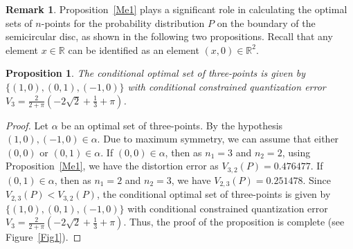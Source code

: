 \documentclass[12pt, reqno]{amsart}
\theoremstyle{plain}
\newtheorem{prop}[subsection]{Proposition}
\theoremstyle{definition}
\newtheorem{remark}[subsection]{Remark}
\newcommand{\set}[1]{\{#1\}}%
\newcommand{\ga}{\alpha}
\newcommand{\D}[1]{\mathbb{#1}}%
\begin{document}
\begin{remark}
Proposition~\ref{Me1} plays a significant role in calculating the optimal sets of $n$-points for the probability distribution $P$ on the boundary of the semicircular disc, as shown in the following two propositions. Recall that any element $x\in \D R$ can be identified as an element $(x, 0)\in \D R^2$.
\end{remark} 
\begin{prop}\label{Me200} 
 The conditional optimal set of three-points is given by $\set{(1, 0), (0, 1), (-1, 0)}$ with conditional constrained quantization error $V_3=\frac 2{2+\pi}(-2 \sqrt{2}+\frac{1}{3}+\pi)$. 
 \end{prop} 
\begin{proof}
Let $\ga$ be an optimal set of three-points. By the hypothesis $(1, 0), (-1 ,0)\in \ga$. Due to maximum symmetry, we can assume that either $(0, 0)$ or $(0, 1) \in \ga$. If $(0, 0) \in \ga$, then as $n_1=3$ and $n_2=2$, using Proposition~\ref{Me1}, we have the distortion error as 
$V_{3, 2}(P)=0.476477.$
If $(0, 1) \in\ga$, then as $n_1=2$ and $n_2=3$,  we have $V_{2, 3}(P)=0.251478$. Since $V_{2, 3}(P)<V_{3, 2}(P)$, the conditional optimal set of three-points is given by $\set{(1, 0), (0, 1), (-1, 0)}$ with conditional constrained quantization error $V_3=\frac 2{2+\pi}(-2 \sqrt{2}+\frac{1}{3}+\pi)$. 
Thus, the proof of the proposition is complete (see Figure~\ref{Fig1}). 
\end{proof}
\end{document}
